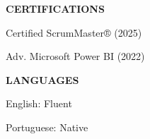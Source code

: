 \documentclass[a4paper,10pt]{article}
\begin{document}
\begin{minipage}[t]{0.35\textwidth}
{\begin{minipage}[t]{\linewidth}
    {\color{accent}\bfseries\small CERTIFICATIONS}\par\vspace{4pt}
    {\color{sidebartext}\footnotesize Certified ScrumMaster® (2025)}\par
    {\color{sidebartext}\footnotesize Adv. Microsoft Power BI (2022)}\par
    \vspace{10pt}

    {\color{accent}\bfseries\small LANGUAGES}\par\vspace{4pt}
    {\color{sidebartext}\footnotesize English: Fluent}\par
    {\color{sidebartext}\footnotesize Portuguese: Native}\par
    \vspace{30pt}
    \end{minipage}%
    }
\end{minipage}%
%
\hfill
%
\end{document}
